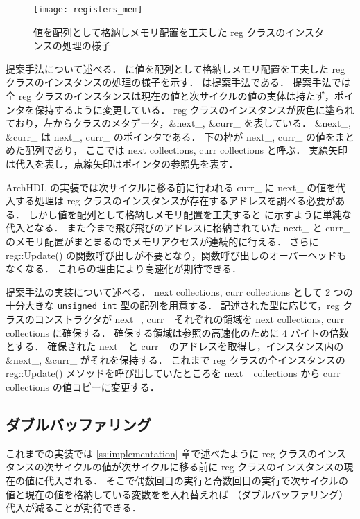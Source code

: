 \begin{figure}[t]
 \centering
 \texttt{[image: registers\_mem]}
 \caption{値を配列として格納しメモリ配置を工夫した reg クラスのインスタンスの処理の様子}
 \label{fig:mem_copy}
\end{figure}

提案手法について述べる．
 に値を配列として格納しメモリ配置を工夫した reg クラスのインスタンスの処理の様子を示す．
 は提案手法である．
提案手法では全 reg クラスのインスタンスは現在の値と次サイクルの値の実体は持たず，ポインタを保持するように変更している．
reg クラスのインスタンスが灰色に塗られており，左からクラスのメタデータ，\&next\_, \&curr\_ を表している．
\&next\_, \&curr\_ は next\_, curr\_ のポインタである．
下の枠が next\_, curr\_ の値をまとめた配列であり，
ここでは next collections, curr collections と呼ぶ．
実線矢印は代入を表し，点線矢印はポインタの参照先を表す．

ArchHDL の実装では次サイクルに移る前に行われる curr\_ に next\_ の値を代入する処理は
reg クラスのインスタンスが存在するアドレスを調べる必要がある．
しかし値を配列として格納しメモリ配置を工夫すると に示すように単純な代入となる．
また今まで飛び飛びのアドレスに格納されていた next\_ と curr\_ のメモリ配置がまとまるのでメモリアクセスが連続的に行える．
さらに reg::Update() の関数呼び出しが不要となり，関数呼び出しのオーバーヘッドもなくなる．
これらの理由により高速化が期待できる．

提案手法の実装について述べる．
next collections, curr collections として 2 つの十分大きな \verb/unsigned int/ 型の配列を用意する．
記述された型に応じて，reg クラスのコンストラクタが next\_, curr\_ それぞれの領域を next collections, curr collections に確保する．
確保する領域は参照の高速化のために 4 バイトの倍数とする．
確保された next\_ と curr\_ のアドレスを取得し，インスタンス内の \&next\_, \&curr\_ がそれを保持する．
これまで reg クラスの全インスタンスの reg::Update() メソッドを呼び出していたところを next\_ collections から curr\_ collections の値コピーに変更する．


\subsection{ダブルバッファリング}

これまでの実装では \ref{ss:implementation} 章で述べたように
reg クラスのインスタンスの次サイクルの値が次サイクルに移る前に reg クラスのインスタンスの現在の値に代入される．
そこで偶数回目の実行と奇数回目の実行で次サイクルの値と現在の値を格納している変数をを入れ替えれば
（ダブルバッファリング）代入が減ることが期待できる．

